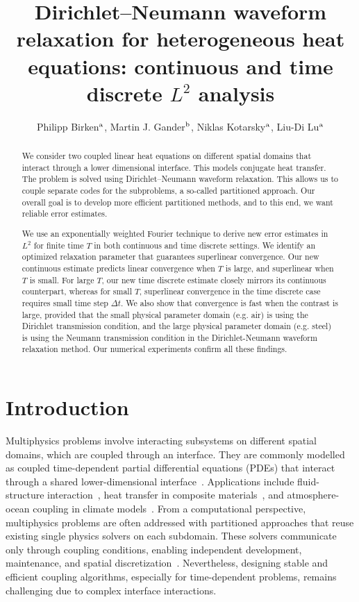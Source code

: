 \documentclass[reqno]{amsart}
\title[DNWR for heterogeneous heat]{Dirichlet--Neumann waveform relaxation for heterogeneous heat equations: continuous and time discrete $L^2$ analysis}
\author[P. Birken, M.J. Gander, N. Kotarsky and L.D.~Lu]{Philipp Birken$^{{\lowercase\mathrm{a}}}$, Martin J. Gander$^{{\lowercase\mathrm{b}}}$, Niklas Kotarsky$^{{\lowercase\mathrm{a}}}$, Liu-Di Lu$^{{\lowercase\mathrm{a}}}$}
\begin{document}
	\begin{abstract}
		We consider two coupled linear heat equations on different spatial domains that interact through a lower dimensional interface. This models conjugate heat transfer. The problem is solved using Dirichlet--Neumann waveform relaxation. This allows us to couple separate codes for the subproblems, a so-called partitioned approach. Our overall goal is to develop more efficient partitioned methods, and to this end, we want reliable error estimates. 
		
		We use an exponentially weighted Fourier technique to derive new error estimates in $L^2$ for finite time $T$ in both continuous and time discrete settings. We identify an optimized relaxation parameter that guarantees superlinear convergence. Our new continuous estimate predicts linear convergence when $T$ is large, and superlinear when $T$ is small. For large $T$, our new time discrete estimate closely mirrors its continuous counterpart, whereas for small $T$, superlinear convergence in the time discrete case requires small time step $\Delta t$. We also show that convergence is fast when the contrast is large, provided that the small physical parameter domain (e.g. air) is using the Dirichlet transmission condition, and the large physical parameter domain (e.g. steel) is using the Neumann transmission condition in the Dirichlet-Neumann waveform relaxation method. Our numerical experiments confirm all these findings. 
\end{abstract}
	
	\maketitle
	
\section{Introduction}

Multiphysics problems involve interacting subsystems on different spatial domains, which are coupled through an interface. They are commonly modelled as coupled time-dependent partial differential equations (PDEs) that interact through a shared lower-dimensional interface~\cite{keyes2013}. Applications include fluid-structure interaction~\cite{lorentzon2020}, heat transfer in composite materials~\cite{kowollik2013}, and atmosphere-ocean coupling in climate models~\cite{schuller2025}. From a computational perspective, multiphysics problems are often addressed with partitioned approaches that reuse existing single physics solvers on each subdomain. These solvers communicate only through coupling conditions, enabling independent development, maintenance, and spatial discretization~\cite{rodenberg2025}. Nevertheless, designing stable and efficient coupling algorithms, especially for time-dependent problems, remains challenging due to complex interface interactions.
\end{document}

